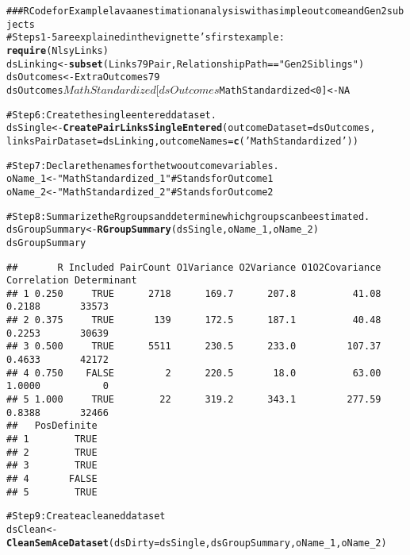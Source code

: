 \documentclass[letterpaper]{article}\usepackage{graphicx, color}
\makeatletter
\newcommand{\hlfunctioncall}[1]{\textcolor[rgb]{0.501960784313725,0,0.329411764705882}{\textbf{#1}}}%
\newcommand{\hlstring}[1]{\textcolor[rgb]{0.6,0.6,1}{#1}}%
\newcommand{\hlcomment}[1]{\textcolor[rgb]{0.180392156862745,0.6,0.341176470588235}{#1}}%
\newenvironment{kframe}{%
 \def\at@end@of@kframe{}%
 \ifinner\ifhmode%
  \def\at@end@of@kframe{\end{minipage}}%
  \begin{minipage}{\columnwidth}%
 \fi\fi%
 \def\FrameCommand##1{\hskip\@totalleftmargin \hskip-\fboxsep
 \colorbox{shadecolor}{##1}\hskip-\fboxsep
     \hskip-\linewidth \hskip-\@totalleftmargin \hskip\columnwidth}%
 \MakeFramed {\advance\hsize-\width
   \@totalleftmargin\z@ \linewidth\hsize
   \@setminipage}}%
 {\par\unskip\endMakeFramed%
 \at@end@of@kframe}
\newenvironment{knitrout}{}{} %
\makeatother
\begin{document}
\begin{knitrout}
\color{fgcolor}\begin{kframe}
\begin{alltt}
\hlcomment{### R Code for Example lavaan estimation analysis with a simple outcome and Gen2 subjects}
\hlcomment{#Steps 1-5 are explained in the vignette's first example:}
\hlfunctioncall{require}(NlsyLinks) 
dsLinking <- \hlfunctioncall{subset}(Links79Pair, RelationshipPath==\hlstring{"Gen2Siblings"})
dsOutcomes <- ExtraOutcomes79 
dsOutcomes$MathStandardized[dsOutcomes$MathStandardized < 0] <- NA

\hlcomment{#Step 6: Create the single entered dataset.}
dsSingle <- \hlfunctioncall{CreatePairLinksSingleEntered}(outcomeDataset=dsOutcomes, 
  linksPairDataset=dsLinking, outcomeNames=\hlfunctioncall{c}(\hlstring{'MathStandardized'}))

\hlcomment{#Step 7: Declare the names for the two outcome variables. }
oName_1 <- \hlstring{"MathStandardized_1"} #Stands for Outcome1
oName_2 <- \hlstring{"MathStandardized_2"} #Stands for Outcome2
  
\hlcomment{#Step 8: Summarize the R groups and determine which groups can be estimated.}
dsGroupSummary <- \hlfunctioncall{RGroupSummary}(dsSingle, oName_1, oName_2)
dsGroupSummary
\end{alltt}
\begin{verbatim}
##       R Included PairCount O1Variance O2Variance O1O2Covariance Correlation Determinant
## 1 0.250     TRUE      2718      169.7      207.8          41.08      0.2188       33573
## 2 0.375     TRUE       139      172.5      187.1          40.48      0.2253       30639
## 3 0.500     TRUE      5511      230.5      233.0         107.37      0.4633       42172
## 4 0.750    FALSE         2      220.5       18.0          63.00      1.0000           0
## 5 1.000     TRUE        22      319.2      343.1         277.59      0.8388       32466
##   PosDefinite
## 1        TRUE
## 2        TRUE
## 3        TRUE
## 4       FALSE
## 5        TRUE
\end{verbatim}
\begin{alltt}

\hlcomment{#Step 9: Create a cleaned dataset}
dsClean <- \hlfunctioncall{CleanSemAceDataset}(dsDirty=dsSingle, dsGroupSummary, oName_1, oName_2)


\end{alltt}
\end{kframe}
\end{knitrout}
\end{document}
